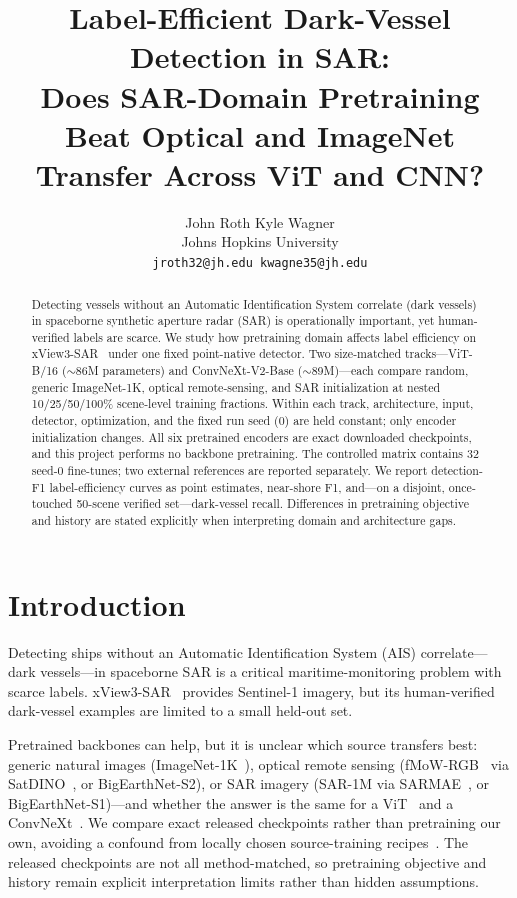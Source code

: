 \documentclass[10pt,twocolumn,letterpaper]{article}
\title{Label-Efficient Dark-Vessel Detection in SAR:\\
Does SAR-Domain Pretraining Beat Optical and ImageNet Transfer Across ViT and CNN?}
\author{John Roth \qquad Kyle Wagner\\
Johns Hopkins University\\
{\tt\small jroth32@jh.edu \qquad kwagne35@jh.edu}
}
\begin{document}
\maketitle

\begin{abstract}
Detecting vessels without an Automatic Identification System correlate
(dark vessels) in spaceborne synthetic aperture radar (SAR) is operationally
important, yet human-verified labels are scarce. We study how pretraining
domain affects label efficiency on xView3-SAR~\cite{paolo2022xview3} under one
fixed point-native detector. Two size-matched tracks---ViT-B/16
($\sim$86M parameters) and ConvNeXt-V2-Base ($\sim$89M)---each compare random,
generic ImageNet-1K, optical remote-sensing, and SAR initialization at nested
10/25/50/100\% scene-level training fractions. Within each track,
architecture, input, detector, optimization, and the fixed run seed (0) are
held constant; only encoder initialization changes. All six pretrained
encoders are exact downloaded checkpoints, and this project performs no
backbone pretraining. The controlled matrix contains 32 seed-0 fine-tunes;
two external references are reported separately. We report detection-F1 label-efficiency curves as
point estimates, near-shore F1, and---on a disjoint, once-touched 50-scene
verified set---dark-vessel recall. Differences in pretraining objective and
history are stated explicitly when interpreting domain and architecture gaps.
\end{abstract}

\section{Introduction}
\label{sec:intro}
Detecting ships without an Automatic Identification System (AIS)
correlate---dark vessels---in spaceborne SAR is a critical maritime-monitoring
problem with scarce labels. xView3-SAR~\cite{paolo2022xview3} provides
Sentinel-1 imagery, but its human-verified dark-vessel examples are limited to
a small held-out set.

Pretrained backbones can help, but it is unclear which source transfers best:
generic natural images (ImageNet-1K~\cite{deng2009imagenet}), optical remote
sensing (fMoW-RGB~\cite{christie2018fmow} via
SatDINO~\cite{straka2025satdino}, or BigEarthNet-S2), or SAR imagery (SAR-1M
via SARMAE~\cite{liu2026sarmae}, or BigEarthNet-S1)---and whether the answer is
the same for a ViT~\cite{dosovitskiy2021image} and a
ConvNeXt~\cite{woo2023convnextv2}. We compare exact released checkpoints
rather than pretraining our own, avoiding a confound from locally chosen
source-training recipes~\cite{zoph2020rethinking}. The released checkpoints
are not all method-matched, so pretraining objective and history remain
explicit interpretation limits rather than hidden assumptions.
\end{document}
